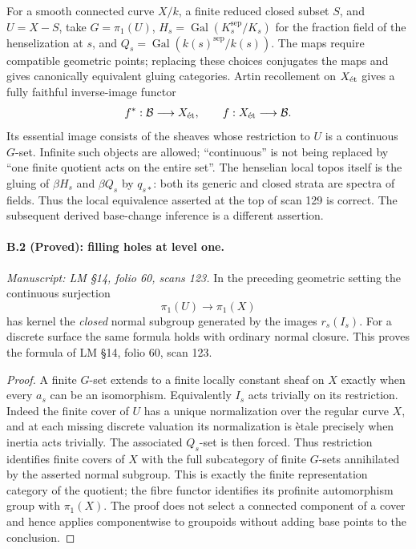 For a smooth connected curve $X/k$, a finite reduced closed subset
$S$, and $U=X-S$, take $G=\pi_1(U)$,
$H_s=\operatorname{Gal}(K_s^{\mathrm{sep}}/K_s)$ for the fraction field
of the henselization at $s$, and $Q_s=\operatorname{Gal}(k(s)^{\mathrm{sep}}/k(s))$.
The maps require compatible geometric points; replacing these choices
conjugates the maps and gives canonically equivalent gluing categories.
Artin recollement on $X_{\mathrm{\acute et}}$ gives a fully faithful inverse-image
functor
\[
 f^*:\mathcal B\longrightarrow X_{\mathrm{\acute et}},\qquad
 f:X_{\mathrm{\acute et}}\longrightarrow\mathcal B.
\]
Its essential image consists of the sheaves whose restriction to $U$
is a continuous $G$-set. Infinite such objects are allowed; ``continuous''
is not being replaced by ``one finite quotient acts on the entire set''.
The henselian local topos itself is the gluing of $\beta H_s$ and
$\beta Q_s$ by $q_{s*}$: both its generic and closed strata are spectra
of fields. Thus the local equivalence asserted at the top of scan 129
is correct. The subsequent derived base-change inference is a different
assertion.

\paragraph{B.2 (Proved): filling holes at level one.}\label{B2}
\textit{Manuscript: LM \S14, folio 60, scans 123.}
In the preceding geometric setting the continuous surjection
\[
 \pi_1(U)\longrightarrow\pi_1(X)
\]
has kernel the \emph{closed} normal subgroup generated by the images
$r_s(I_s)$. For a discrete surface the same formula holds with ordinary
normal closure. This proves the formula of LM \S14, folio 60, scan 123.

\begin{proof}
A finite $G$-set extends to a finite locally constant sheaf on $X$
exactly when every $a_s$ can be an isomorphism. Equivalently $I_s$
acts trivially on its restriction. Indeed the finite cover of $U$ has
a unique normalization over the regular curve $X$, and at each missing
discrete valuation its normalization is \`etale precisely when inertia
acts trivially. The associated $Q_s$-set is then forced. Thus restriction
identifies finite covers of $X$ with the full subcategory of finite
$G$-sets annihilated by the asserted normal subgroup. This is exactly
the finite representation category of the quotient; the fibre functor
identifies its profinite automorphism group with $\pi_1(X)$. The proof
does not select a connected component of a cover and hence applies
componentwise to groupoids without adding base points to the conclusion.
\end{proof}

